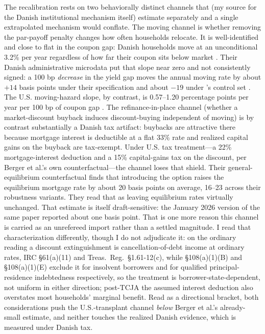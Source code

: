 \documentclass[12pt]{article}
\begin{document}
The recalibration rests on two behaviorally distinct channels that \citet{berger2026} (my source for the Danish institutional mechanism itself) estimate separately and a single extrapolated mechanism would conflate. The moving channel is whether removing the par-payoff penalty changes how often households relocate. It is well-identified and close to flat in the coupon gap: Danish households move at an unconditional 3.2\% per year regardless of how far their coupon sits below market \citep[\S4.6, structural parameters in tab.~3]{berger2026}. Their Danish administrative microdata put that slope near zero and not consistently signed: a 100 bp \emph{decrease} in the yield gap moves the annual moving rate by about $+14$ basis points under their specification and about $-19$ under \citeauthor{fonseca2024}'s control set \citep[\S3.3.2]{berger2026}. The U.S. moving-hazard slope, by contrast, is 0.57--1.20 percentage points per year per 100 bp of coupon gap \citep{fonseca2024}. The refinance-in-place channel (whether a market-discount buyback induces discount-buying independent of moving) is by contrast substantially a Danish tax artifact: buybacks are attractive there because mortgage interest is deductible at a flat 33\% rate and realized capital gains on the buyback are tax-exempt. Under U.S. tax treatment---a 22\% mortgage-interest deduction and a 15\% capital-gains tax on the discount, per Berger et al.'s own counterfactual---the channel loses that shield. Their general-equilibrium counterfactual \citep[\S4.10.2]{berger2026} finds that introducing the option raises the equilibrium mortgage rate by about 20 basis points on average, 16--23 across their robustness variants. They read that as leaving equilibrium rates virtually unchanged. That estimate is itself draft-sensitive: the January 2026 version of the same paper reported about one basis point. That is one more reason this channel is carried as an unrefereed import rather than a settled magnitude. I read that characterization differently, though I do not adjudicate it: on the ordinary reading a discount extinguishment is cancellation-of-debt income at ordinary rates, IRC \S 61(a)(11) and Treas.\ Reg.\ \S 1.61-12(c), while \S 108(a)(1)(B) and \S 108(a)(1)(E) exclude it for insolvent borrowers and for qualified principal-residence indebtedness respectively, so the treatment is borrower-state-dependent, not uniform in either direction; post-TCJA the assumed interest deduction also overstates most households' marginal benefit. Read as a directional bracket, both considerations push the U.S.-transplant channel \emph{below} Berger et al.'s already-small estimate, and neither touches the realized Danish evidence, which is measured under Danish tax.
\end{document}
